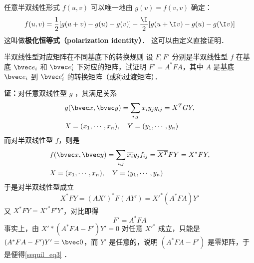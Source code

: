 任意半双线性形式 $f(u, v)$ 可以唯一地由 $g(v) = f(v, v)$ 确定：
\begin{equation}
f(u, v) =\frac{1}{2}[g(u+v)-g(u)-g(v)]
-\frac{\I}{2}[g(u+\I v)-g(u)-g(\I v)]
\end{equation}
这叫做\textbf{极化恒等式（polarization identity）}． 这可以由定义直接证明．
\begin{example}{半双线性型对应矩阵在不同基底下的转换规则}\label{sequil_ex1}
设 $F,F'$ 分别是半双线性型 $f$ 在基底 $\bvec e_i$ 和 $\bvec e'_i$ 下对应的矩阵，试证明 $F'=A^*FA$，其中 $A$ 是基底 $\bvec e_i$ 到 $\bvec e'_i$ 的转换矩阵（或称过渡矩阵）．

\textbf{证：}对任意双线性型 $g$ ，其满足关系
\begin{equation}
\begin{aligned}
&g(\bvec x,\bvec y)=\sum_{i,j}x_i y_j g_{ij}=X^TGY,\\
&X=(x_1,\cdots,x_n),\quad Y=(y_1,\cdots,y_n)
\end{aligned}
\end{equation}
而对半双线性型 $f$，则是
\begin{equation}
\begin{aligned}
&f(\bvec x,\bvec y)=\sum_{i,j}\overline{x_i} y_j f_{ij}=\overline{X^T}FY=X^*FY,\\
&X=(x_1,\cdots,x_n),\quad Y=(y_1,\cdots,y_n)
\end{aligned}
\end{equation}
于是对半双线性型成立
\begin{equation}
X^*FY=(AX')^*F(AY')={X'}^*(A^*FA)Y'
\end{equation}
又 $X^* F Y=X'^* F'Y'$，对比即得
\begin{equation}\label{sequil_eq3}
F'=A^*F A
\end{equation}
事实上，由 ${X'}*(A^*FA-F')Y'=0$ 对任意 $X'^*$ 成立，只能是 $(A^*FA-F')Y'=\bvec 0$，而 $Y'$ 是任意的，说明 $(A^*FA-F')$ 是零矩阵，于是便得\autoref{sequil_eq3} ．
\end{example}